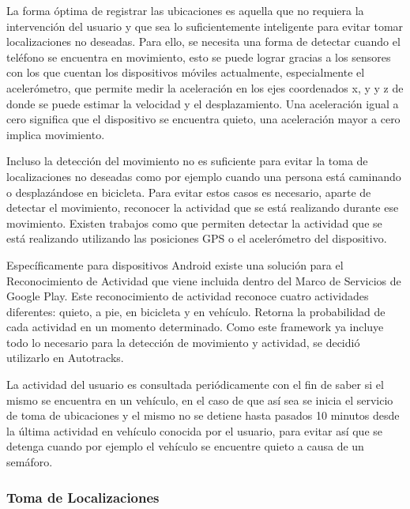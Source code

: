 La forma óptima de registrar las ubicaciones es aquella que no requiera la intervención del usuario y que sea lo suficientemente inteligente para evitar tomar localizaciones no deseadas. Para ello, se necesita una forma de detectar cuando el teléfono se encuentra en movimiento, esto se puede lograr gracias a los sensores con los que cuentan los dispositivos móviles actualmente, especialmente el acelerómetro, que permite medir la aceleración en los ejes coordenados x, y y z de donde se puede estimar la velocidad y el desplazamiento. Una aceleración igual a cero significa que el dispositivo se encuentra quieto, una aceleración mayor a cero implica movimiento.

Incluso la detección del movimiento no es suficiente para evitar la toma de localizaciones no deseadas como por ejemplo cuando una persona está caminando o desplazándose en bicicleta. Para evitar estos casos es necesario, aparte de detectar el movimiento, reconocer la actividad que se está realizando durante ese movimiento. Existen trabajos como \cite{liao2006location,bao2004activity,ravi2005activity} que permiten detectar la actividad que se está realizando utilizando las posiciones GPS o el acelerómetro del dispositivo.

Específicamente para dispositivos Android existe una solución para el Reconocimiento de Actividad que viene incluida dentro del Marco de Servicios de Google Play. Este reconocimiento de actividad reconoce cuatro actividades diferentes: quieto, a pie, en bicicleta y en vehículo. Retorna la probabilidad de cada actividad en un momento determinado. Como este framework ya incluye todo lo necesario para la detección de movimiento y actividad, se decidió utilizarlo en Autotracks.

La actividad del usuario es consultada periódicamente con el fin de saber si el mismo se encuentra en un vehículo, en el caso de que así sea se inicia el servicio de toma de ubicaciones y el mismo no se detiene hasta pasados 10 minutos desde la última actividad en vehículo conocida por el usuario, para evitar así que se detenga cuando por ejemplo el vehículo se encuentre quieto a causa de un semáforo. 

\subsubsection{Toma de Localizaciones}

